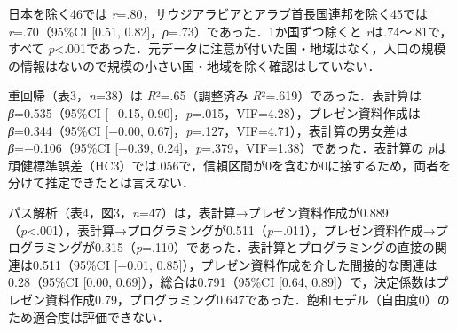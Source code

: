 \documentclass[a4paper,10pt,twocolumn]{ltjsarticle}
\begin{document}
日本を除く46では \textit{r}=.80，サウジアラビアとアラブ首長国連邦を除く45では \textit{r}=.70（95\%CI [0.51, 0.82]，\textit{ρ}=.73）であった．1か国ずつ除くと \textit{r}は.74〜.81で，すべて \textit{p}<.001であった．元データに注意が付いた国・地域はなく，人口の規模の情報はないので規模の小さい国・地域を除く確認はしていない．

重回帰（表3，\textit{n}=38）は \textit{R}²=.65（調整済み \textit{R}²=.619）であった．表計算は \textit{β}=0.535（95\%CI [−0.15, 0.90]，\textit{p}=.015，VIF=4.28），プレゼン資料作成は \textit{β}=0.344（95\%CI [−0.00, 0.67]，\textit{p}=.127，VIF=4.71），表計算の男女差は \textit{β}=−0.106（95\%CI [−0.39, 0.24]，\textit{p}=.379，VIF=1.38）であった．表計算の \textit{p}は頑健標準誤差（HC3）では.056で，信頼区間が0を含むか0に接するため，両者を分けて推定できたとは言えない．

パス解析（表4，図3，\textit{n}=47）は，表計算→プレゼン資料作成が0.889（\textit{p}<.001），表計算→プログラミングが0.511（\textit{p}=.011），プレゼン資料作成→プログラミングが0.315（\textit{p}=.110）であった．表計算とプログラミングの直接の関連は0.511（95\%CI [−0.01, 0.85]），プレゼン資料作成を介した間接的な関連は0.28（95\%CI [0.00, 0.69]），総合は0.791（95\%CI [0.64, 0.89]）で，決定係数はプレゼン資料作成0.79，プログラミング0.647であった．飽和モデル（自由度0）のため適合度は評価できない．
\end{document}
